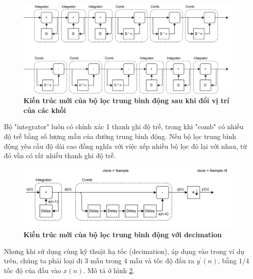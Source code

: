 \begin{figure}[ht!]
    \centering
    \includegraphics[width=14cm]{Images/Chuong2/cic/cic_5.png}
    \caption[Kiến trúc mới của bộ lọc trung bình động sau khi đổi vị trí của các khối]{\bfseries \fontsize{12pt}{0pt}\selectfont Kiến trúc mới của bộ lọc trung bình động sau khi đổi vị trí của các khối}
    \label{cic_5}
\end{figure}
Bộ "integrator" luôn có chính xác 1 thanh ghi độ trễ, trong khi "comb" có nhiều độ trễ bằng số lượng mẫu của đường trung bình động. Nếu bộ lọc trung bình động yêu cầu độ dài cao đồng nghĩa với việc xếp nhiều bộ lọc đó lại với nhau, từ đó vẫn có rất nhiều thanh ghi độ trễ.

\begin{figure}[H]
    \centering
    \includegraphics[width=14cm]{Images/Chuong2/cic/cic_6.png}
    \caption[Kiến trúc mới của bộ lọc trung bình động với decimation]{\bfseries \fontsize{12pt}{0pt}\selectfont Kiến trúc mới của bộ lọc trung bình động với decimation}
    \label{cic_6}
\end{figure}
Nhưng khi sử dụng cùng kỹ thuật hạ tốc (decimation), áp dụng vào trong ví dụ trên, chúng ta phải loại đi 3 mẫu trong 4 mẫu và tốc độ đầu ra $y^\prime(n)$, bằng $1/4$ tốc độ của đầu vào $x(n)$. Mô tả ở hình \ref{cic_6}.

